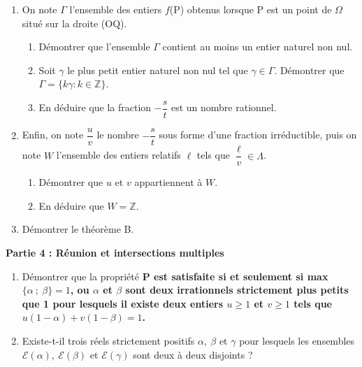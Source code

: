 \documentclass[landscape,twocolumn,leqno,a4paper,10pt]{report} %
\renewcommand{\textbf}[1]{\begingroup\bfseries\mathversion{bold}#1\endgroup}		%
\newcommand\Z{\mathbb{Z}}
\begin{document}
\begin{enumerate}[resume]
	\begin{enumerate}
		\item Démontrer que $\Lambda$ contient $\lambda$ mais aucun élément de l'intervalle $]0~;~\lambda[$.
		\item En déduire que $\Lambda = \{k \lambda: k \in \Z\}$.
	\end{enumerate}
\item%
On note $\Gamma$ l'ensemble des entiers $f$(P) obtenus lorsque P est un point de $\Omega$ situé sur la droite (OQ).
	\begin{enumerate}
		\item Démontrer que l'ensemble $\Gamma$ contient au moins un entier naturel non nul.
		\item Soit $\gamma$ le plus petit entier naturel non nul tel que $\gamma \in \Gamma$. Démontrer que $\Gamma= \{k\gamma : k \in  \Z\}$.
		\item En déduire que la fraction $- \dfrac st$ est un nombre rationnel.
	\end{enumerate}
\item%
Enfin, on note $\dfrac uv$ le nombre  $- \dfrac st$ sous forme d'une fraction irréductible, puis on note $W$ l'ensemble des entiers relatifs $\ell$ tels que $\dfrac{\ell}{v} \in \Lambda$.
	\begin{enumerate}
		\item Démontrer que $u$ et $v$ appartiennent à $W$.
		\item En déduire que $W = \Z$.
	\end{enumerate}
\item%
Démontrer le théorème B.
\end{enumerate}

\bigskip
\begin{center}
\textbf{Partie 4 : Réunion et intersections multiples
}\end{center}

\begin{enumerate}[resume]
\item Démontrer que la propriété \textbf{P}{\small $\cup$} est satisfaite si et seulement si max$\{\alpha~;~\beta\} = 1$, ou $\alpha$ et $\beta$ sont deux irrationnels strictement plus petits que 1 pour lesquels il existe deux entiers $u \geqslant 1$
et $v \geqslant 1$ tels que $u(1 - \alpha) + v(1 - \beta) = 1$.
\item Existe-t-il trois réels strictement positifs $\alpha,\: \beta$ et $\gamma$ pour lesquels les ensembles $\mathcal{E}(\alpha),\: \mathcal{E}(\beta)$ et $\mathcal{E}(\gamma)$ sont deux à deux disjoints ?
\end{enumerate}
\end{document}
